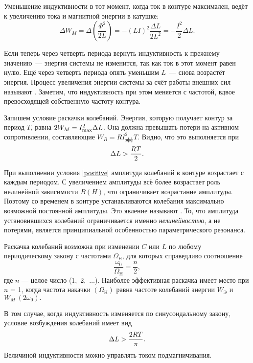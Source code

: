 Уменьшение индуктивности в тот момент, когда ток в контуре максимален, ведёт к
увеличению тока и магнитной энергии в катушке:
\begin{equation*}
	\Delta W_M = \Delta \left(\frac{\Phi^2}{2L}\right) = - (LI)^2\frac{\Delta
L}{2L^2} = - \frac{I^2}{2}\Delta L.
\end{equation*}

Если теперь через четверть периода вернуть индуктивность к прежнему значению~---
энергия системы не изменится, так как ток в этот момент равен нулю. Ещё через
четверть периода опять уменьшим $L$~--- снова возрастёт энергия. Процесс
увеличения энергии системы за счёт работы внешних сил называют 
.
Заметим, что индуктивность при этом меняется с частотой, вдвое превосходящей
собственную частоту контура.

Запишем условие раскачки колебаний.
Энергия, которую получает контур за период $T$, равна  
$2W_M = I^2_{\rm max} \Delta L$. Она должна превышать потери на активном 
сопротивлении, составляющие $W_R = RI^2_\text{эфф}T$. Видно, что это
выполняется при 
\begin{equation}
\eqmark{positive}
\Delta L > \frac{RT}{2}.
\end{equation}

При выполнении условия \eqref{positive} амплитуда колебаний в
контуре возрастает с каждым периодом. С увеличением амплитуды всё более
возрастает роль нелинейной зависимости $B(H)$, что ограничивает возрастание
амплитуды. Поэтому со временем в контуре устанавливаются колебания максимально
возможной постоянной амплитуды. Это явление называют . То, что амплитуда установившихся колебаний ограничивается именно 
\emph{нелинейностью}, а не потерями, является принципиальной особенностью 
параметрического резонанса.

Раскачка колебаний возможна при изменении $C$ или $L$ по любому периодическому
закону с частотами $\Omega_\text{Н}$, для которых справедливо соотношение
\begin{equation*}
	\frac{\omega_0}{\Omega_\text{Н}} = \frac{n}{2},
\end{equation*}
где $n$ --- целое число (1,~2,~$\dots$). Наиболее эффективная раскачка имеет
место при $n$ = 1, когда частота накачки $(\Omega_\text{Н})$ равна частоте
колебаний энергии $W_\text{Э}$ и $W_M~(2\omega_0).$

 В том случае, когда индуктивность изменяется по синусоидальному закону, условие
возбуждения колебаний имеет вид
\begin{equation}
	\eqmark{4.6.3}
	\Delta L > \frac{2RT}{\pi}.
\end{equation}
Величиной индуктивности можно управлять током подмагничивания.

